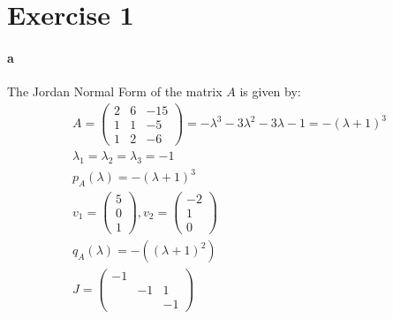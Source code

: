 \section{Exercise 1}
\paragraph{a}
The Jordan Normal Form of the matrix $A$ is given by:
\begin{gather*}
A = \left( \begin{array}{ccc}
2 & 6 & -15 \\
1 & 1 & -5 \\
1 & 2 & -6 
\end{array} \right) = 
-\lambda^3 -3 \lambda^2 - 3\lambda -1  = -(\lambda+1)^3\\
\lambda_1 = \lambda_2 = \lambda_3 = -1\\
p_A(\lambda) = -(\lambda+1)^3 \\
v_1 = \left( \begin{array}{c}
5\\
0\\
1
\end{array} \right),
v_2 = \left( \begin{array}{c}
-2\\
1\\
0
\end{array} \right)\\
q_A(\lambda) = -\left( (\lambda+1)^2\right)\\
J = \left( \begin{array}{ccc} 
-1& &\\
& -1 &1\\
& & -1
\end{array} \right)
\end{gather*}
